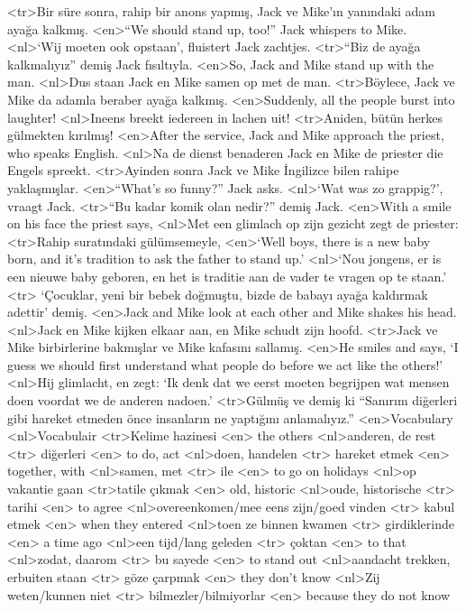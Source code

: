 <tr>Bir süre sonra, rahip bir anons yapmış, Jack ve Mike'ın yanındaki adam ayağa kalkmış. 
<en>“We should stand up, too!” Jack whispers to Mike.
<nl>`Wij moeten ook opstaan', fluistert Jack zachtjes.
<tr>“Biz de ayağa kalkmalıyız” demiş Jack fısıltıyla.
<en>So, Jack and Mike stand up with the man. 
<nl>Dus staan Jack en Mike samen op met de man. 
<tr>Böylece, Jack ve Mike da adamla beraber ayağa kalkmış. 
<en>Suddenly, all the people burst into laughter!
<nl>Ineens breekt iedereen in  lachen uit!
<tr>Aniden, bütün herkes gülmekten kırılmış!
<en>After the service, Jack and Mike approach the priest, who speaks English.
<nl>Na de dienst benaderen Jack en Mike de priester die Engels spreekt.
<tr>Ayinden sonra Jack ve Mike İngilizce bilen  rahipe yaklaşmışlar.
<en>“What’s so funny?” Jack asks.
<nl>`Wat was zo grappig?', vraagt Jack.
<tr>“Bu kadar komik olan nedir?” demiş Jack.
<en>With a smile on his face the priest says, 
<nl>Met een glimlach op zijn gezicht zegt de priester: 
<tr>Rahip suratındaki gülümsemeyle,
<en>`Well boys, there is a new baby born, and it’s tradition  to ask the father to stand up.'
<nl>`Nou jongens, er is een nieuwe baby geboren, en het is traditie  aan de vader te vragen op te staan.'
<tr> `Çocuklar, yeni bir bebek doğmuştu, bizde de babayı ayağa kaldırmak adettir' demiş.
<en>Jack and Mike look at each other and Mike shakes his head. 
<nl>Jack en Mike kijken elkaar aan, en Mike schudt zijn hoofd. 
<tr>Jack ve Mike birbirlerine bakmışlar ve Mike kafasını sallamış. 
<en>He smiles and says, `I guess we should first understand what people do before we act like the others!'
<nl>Hij glimlacht, en zegt: `Ik denk dat we eerst moeten begrijpen wat mensen doen voordat we de anderen nadoen.'
<tr>Gülmüş ve demiş ki “Sanırım diğerleri gibi hareket etmeden önce insanların ne yaptığını anlamalıyız.”
<en>Vocabulary
<nl>Vocabulair
<tr>Kelime hazinesi
<en> the others 
<nl>anderen, de rest  
<tr> diğerleri
<en> to do, act 
<nl>doen, handelen 
<tr> hareket etmek 
<en> together, with 
<nl>samen, met 
<tr> ile 
<en> to go on holidays 
<nl>op vakantie gaan
<tr>tatile çıkmak
<en> old, historic 
<nl>oude,  historische 
<tr> tarihi 
<en> to agree 
<nl>overeenkomen/mee eens zijn/goed vinden  
<tr> kabul etmek  
<en> when they entered 
<nl>toen ze binnen kwamen 
<tr> girdiklerinde  
<en> a time ago 
<nl>een tijd/lang geleden 
<tr> çoktan 
<en> to that 
<nl>zodat, daarom 
<tr> bu sayede
<en> to stand out 
<nl>aandacht trekken, erbuiten staan 
<tr> göze çarpmak 
<en> they don't know 
<nl>Zij weten/kunnen niet  
<tr> bilmezler/bilmiyorlar 
<en> because they do not know 
